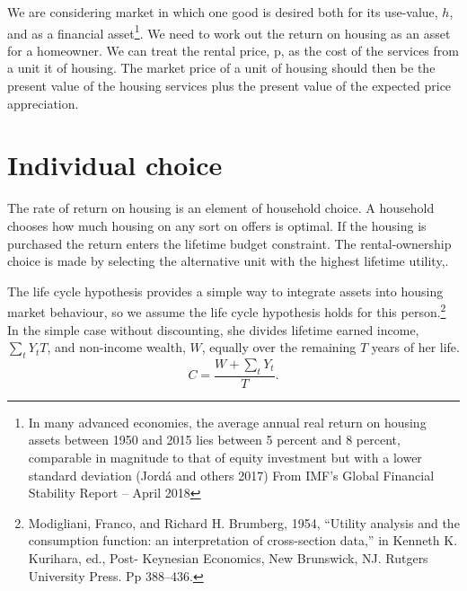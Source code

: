 We are considering market in which one good is desired  both for its use-value, $h$, and as a financial asset\footnote{ In many advanced economies, the average annual real return on housing assets between 1950 and 2015 lies between 5 percent and 8 percent, comparable in magnitude to that of equity investment but with a lower standard deviation (Jord\'a and others 2017) From IMF’s Global Financial Stability Report – April 2018}.   We need to work out the return on housing as an asset for a homeowner. We can treat the rental price, p, as the cost of the services from a unit it of housing. The market price of a unit of housing  should then be the present value of the housing services plus the present value of the expected price appreciation. 
\section{Individual choice}

The rate of return on housing is an element of household choice. A household chooses how much housing on any sort on offers is optimal. If the housing is purchased the return enters the lifetime budget constraint. The rental-ownership choice is made by selecting the alternative unit with the highest lifetime utility,. 

The life cycle hypothesis provides a simple way to integrate assets into housing market behaviour, so we assume the life cycle hypothesis holds for this person.\footnote{Modigliani, Franco, and Richard H. Brumberg, 1954, “Utility analysis and the consumption function: an interpretation of cross-section data,” in Kenneth K. Kurihara, ed., Post- Keynesian Economics, New Brunswick, NJ. Rutgers University Press. Pp 388–436.} In the simple case without discounting, she divides lifetime earned income, $\sum_t{Y_t}{T}$, and non-income wealth, $W$, equally over the remaining $T$ years of her life.  
    \[C = \frac{W+\sum_tY_t}{T}.\]


